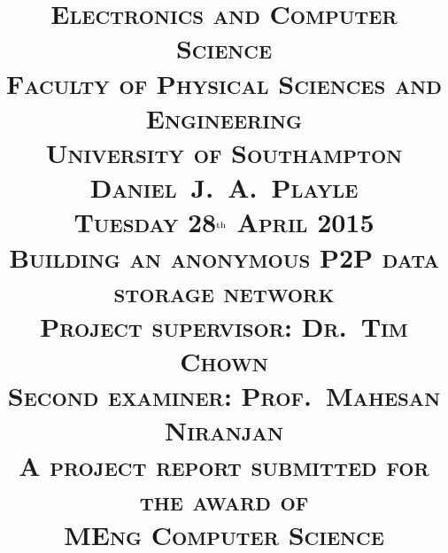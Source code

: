 \clearpage
\title{ 
	\vspace{-1.0cm}
	\large{
		\textsc{Electronics and Computer Science}\\
		\textsc{Faculty of Physical Sciences and Engineering}\\
		\textsc{University of Southampton}\\
	}
	\large{
		\vspace{2.5cm}
		\textsc{Daniel~J.~A.~Playle}\\
		\vspace{1.0cm}
		\textsc{Tuesday 28$^\textnormal{th}$ April 2015}\\
	}
		\vspace{2.5cm}
	\LARGE{
		\textsc{
			Building an anonymous P2P data storage network\\
		}
	}
	\large{
		\vspace{3.5cm}
		\textsc{Project supervisor: Dr.~Tim Chown}\\
		\textsc{Second examiner: Prof.~Mahesan Niranjan}\\
		\vspace{2.5cm}
		\textsc{A project report submitted for the award of}\\
		\textsc{MEng Computer Science\vspace{-3.0cm}}}
	}
\author{}
\date{}
\maketitle
\thispagestyle{empty}

